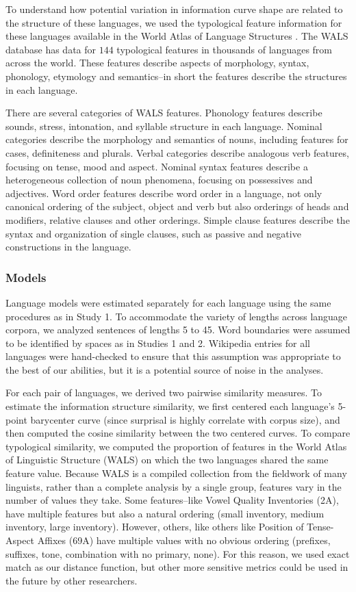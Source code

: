 \documentclass[entropy,article,submit,moreauthors,pdftex]{mdpi}
\begin{document}
To understand how potential variation in information curve shape are
related to the structure of these languages, we used the typological
feature information for these languages available in the World Atlas of
Language Structures \citep[WALS,][]{wals}. The WALS database has data
for \(144\) typological features in thousands of languages from across
the world. These features describe aspects of morphology, syntax,
phonology, etymology and semantics--in short the features describe the
structures in each language.

There are several categories of WALS features. Phonology features
describe sounds, stress, intonation, and syllable structure in each
language. Nominal categories describe the morphology and semantics of
nouns, including features for cases, definiteness and plurals. Verbal
categories describe analogous verb features, focusing on tense, mood and
aspect. Nominal syntax features describe a heterogeneous collection of
noun phenomena, focusing on possessives and adjectives. Word order
features describe word order in a language, not only canonical ordering
of the subject, object and verb but also orderings of heads and
modifiers, relative clauses and other orderings. Simple clause features
describe the syntax and organization of single clauses, such as passive
and negative constructions in the language.

\hypertarget{models-2}{%
\subsubsection{Models}\label{models-2}}

Language models were estimated separately for each language using the
same procedures as in Study 1. To accommodate the variety of lengths
across language corpora, we analyzed sentences of lengths 5 to 45. Word
boundaries were assumed to be identified by spaces as in Studies 1 and
2. Wikipedia entries for all languages were hand-checked to ensure that
this assumption was appropriate to the best of our abilities, but it is
a potential source of noise in the analyses.

For each pair of languages, we derived two pairwise similarity measures.
To estimate the information structure similarity, we first centered each
language's 5-point barycenter curve (since surprisal is highly correlate
with corpus size), and then computed the cosine similarity between the
two centered curves. To compare typological similarity, we computed the
proportion of features in the World Atlas of Linguistic Structure (WALS)
on which the two languages shared the same feature value. Because WALS
is a compiled collection from the fieldwork of many linguists, rather
than a complete analysis by a single group, features vary in the number
of values they take. Some features--like Vowel Quality Inventories (2A),
have multiple features but also a natural ordering (small inventory,
medium inventory, large inventory). However, others, like others like
Position of Tense-Aspect Affixes (69A) have multiple values with no
obvious ordering (prefixes, suffixes, tone, combination with no primary,
none). For this reason, we used exact match as our distance function,
but other more sensitive metrics could be used in the future by other
researchers.
\end{document}
